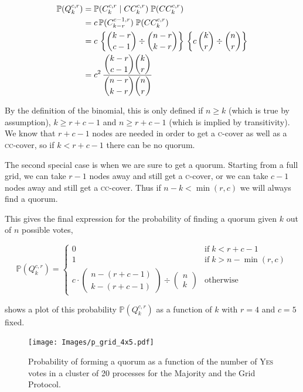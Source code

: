 \documentclass[12pt,chapterprefix=true,toc=bibliography,numbers=noendperiod,
               footnotes=multiple,twoside]{scrreprt}
\newcommand{\yes}{{\fontfamily{jkposn}\selectfont\textsc{Yes}}}
\begin{document}
\begin{align*}
    \mathbb{P}(Q^{c,r}_k)
    &= \mathbb{P}(C^{c,r}_k\;|\;CC^{c,r}_k) \; \mathbb{P}(CC^{c,r}_k) \\
    &= c \, \mathbb{P}(C^{c-1,r}_{k-r}) \; \mathbb{P}(CC^{c,r}_k) \\
    &= c \, \left\{\dbinom{k-r}{c-1} \div \dbinom{n-r}{k-r}\right\} \, \left\{c \, \dbinom{k}{r} \div \dbinom{n}{r}\right\} \\
    &= c^2 \, \frac{\dbinom{k-r}{c-1} \dbinom{k}{r}}{\dbinom{n-r}{k-r} \dbinom{n}{r}}
\end{align*}

By the definition of the binomial, this is only defined if \(n \geq k\) (which is true by assumption), \(k \geq r+c-1\) and \(n \geq r+c-1\) (which is implied by transitivity). We know that \(r+c-1\) nodes are needed in order to get a \textsc{c}-cover as well as a \textsc{cc}-cover, so if \(k < r+c-1\) there can be no quorum.

The second special case is when we are sure to get a quorum. Starting from a full grid, we can take \(r-1\) nodes away and still get a  \textsc{c}-cover, or we can take \(c-1\) nodes away and still get a \textsc{cc}-cover. Thus if \(n-k < \min(r,c)\) we will always find a quorum.

This gives the final expression for the probability of finding a quorum given \(k\) out of \(n\) possible votes,

\[
\mathbb{P}(Q^{c,r}_k) =
    \begin{cases}
        0 & \text{if}\;k < r+c-1 \\
        1 & \text{if}\;k > n - \min(r,c) \\
        {c \cdot \begin{pmatrix}n-(r+c-1) \\ k-(r+c-1)\end{pmatrix}} \div {\begin{pmatrix}n \\ k\end{pmatrix}} & \text{otherwise}
    \end{cases}
\]

 shows a plot of this probability \(\mathbb{P}(Q^{c,r}_k)\) as a function of \(k\) with \(r = 4\) and \(c = 5\) fixed.

\begin{figure}[h]
    \centering
    \texttt{[image: Images/p\_grid\_4x5.pdf]}
    \caption{Probability of forming a quorum as a function of the number of \yes{} votes in a cluster of 20 processes for the Majority and the Grid Protocol.}
    \label{fig:p_grid}
\end{figure}
\end{document}
